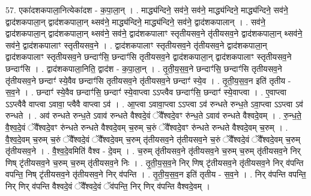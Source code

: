 \documentclass[17pt]{extarticle}
\begin{document}
57. एका॑दशकपाला॒नित्येका॑दश - क॒पा॒ला॒न् । . माद्ध्य॑न्दिने॒ सव॑ने॒ सव॑ने॒ माद्ध्य॑न्दिने॒ माद्ध्य॑न्दिने॒ सव॑ने॒ द्वाद॑शकपाला॒न् द्वाद॑शकपाला॒न् थ्सव॑ने॒ माद्ध्य॑न्दिने॒ माद्ध्य॑न्दिने॒ सव॑ने॒ द्वाद॑शकपालान् । . सव॑ने॒ द्वाद॑शकपाला॒न् द्वाद॑शकपाला॒न् थ्सव॑ने॒ सव॑ने॒ द्वाद॑शकपालाꣳ स्तृतीयसव॒ने तृ॑तीयसव॒ने द्वाद॑शकपाला॒न् थ्सव॑ने॒ सव॑ने॒ द्वाद॑शकपालाꣳ स्तृतीयसव॒ने । . द्वाद॑शकपालाꣳ स्तृतीयसव॒ने तृ॑तीयसव॒ने द्वाद॑शकपाला॒न् द्वाद॑शकपालाꣳ स्तृतीयसव॒ने छन्दाꣳ॑सि॒ छन्दाꣳ॑सि तृतीयसव॒ने द्वाद॑शकपाला॒न् द्वाद॑शकपालाꣳ स्तृतीयसव॒ने छन्दाꣳ॑सि । . द्वाद॑शकपाला॒निति॒ द्वाद॑श - क॒पा॒ला॒न् । . तृ॒ती॒य॒स॒व॒ने छन्दाꣳ॑सि॒ छन्दाꣳ॑सि तृतीयसव॒ने तृ॑तीयसव॒ने छन्दाꣳ॑ स्ये॒वैव छन्दाꣳ॑सि तृतीयसव॒ने तृ॑तीयसव॒ने छन्दाꣳ॑ स्ये॒व । . तृ॒ती॒य॒स॒व॒न इति॑ तृतीय - स॒व॒ने । . छन्दाꣳ॑ स्ये॒वैव छन्दाꣳ॑सि॒ छन्दाꣳ॑ स्ये॒वाप्त्वा ऽऽप्त्वैव छन्दाꣳ॑सि॒ छन्दाꣳ॑ स्ये॒वाप्त्वा । . ए॒वाप्त्वा ऽऽप्त्वैवै वाप्त्वा ऽवावा॒ प्त्वैवै वाप्त्वा ऽव॑ । . आ॒प्त्वा ऽवावा॒प्त्वा ऽऽप्त्वा ऽव॑ रुन्धते रुन्ध॒ते ऽवा॒प्त्वा ऽऽप्त्वा ऽव॑ रुन्धते । . अव॑ रुन्धते रुन्ध॒ते ऽवाव॑ रुन्धते वैश्वदे॒वं ॅवै᳚श्वदे॒वꣳ रु॑न्ध॒ते ऽवाव॑ रुन्धते वैश्वदे॒वम् । . रु॒न्ध॒ते॒ वै॒श्व॒दे॒वं ॅवै᳚श्वदे॒वꣳ रु॑न्धते रुन्धते वैश्वदे॒वम् च॒रुम् च॒रुं ॅवै᳚श्वदे॒वꣳ रु॑न्धते रुन्धते वैश्वदे॒वम् च॒रुम् । . वै॒श्व॒दे॒वम् च॒रुम् च॒रुं ॅवै᳚श्वदे॒वं ॅवै᳚श्वदे॒वम् च॒रुम् तृ॑तीयसव॒ने तृ॑तीयसव॒ने च॒रुं ॅवै᳚श्वदे॒वं ॅवै᳚श्वदे॒वम् च॒रुम् तृ॑तीयसव॒ने । . वै॒श्व॒दे॒वमिति॑ वैश्व - दे॒वम् । . च॒रुम् तृ॑तीयसव॒ने तृ॑तीयसव॒ने च॒रुम् च॒रुम् तृ॑तीयसव॒ने निर् णिष् टृ॑तीयसव॒ने च॒रुम् च॒रुम् तृ॑तीयसव॒ने निः । . तृ॒ती॒य॒स॒व॒ने निर् णिष् टृ॑तीयसव॒ने तृ॑तीयसव॒ने निर् व॑पन्ति वपन्ति॒ निष् टृ॑तीयसव॒ने तृ॑तीयसव॒ने निर् व॑पन्ति । . तृ॒ती॒य॒स॒व॒न इति॑ तृतीय - स॒व॒ने । . निर् व॑पन्ति वपन्ति॒ निर् णिर् व॑पन्ति वैश्वदे॒वं ॅवै᳚श्वदे॒वं ॅव॑पन्ति॒ निर् णिर् व॑पन्ति वैश्वदे॒वम् । \newline
\end{document}
